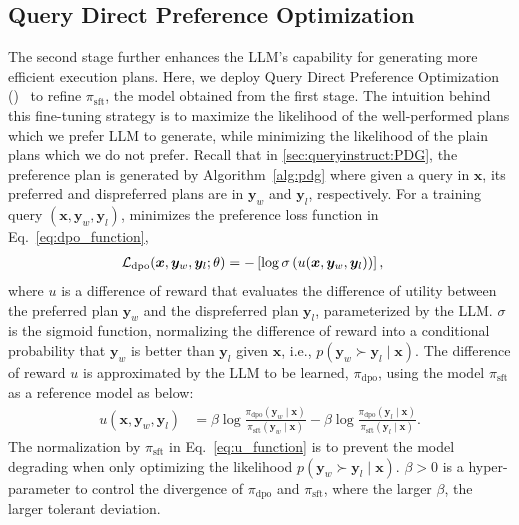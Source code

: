 \subsection{Query Direct Preference Optimization}
The second stage further enhances the LLM's capability for generating more efficient execution plans. 
Here, we deploy Query Direct Preference Optimization (\QDPO)~\cite{DBLP:conf/nips/RafailovSMMEF23} to refine  $\pi_{\mathrm{sft}}$, the model obtained from the first stage. 
The intuition behind this fine-tuning strategy is to maximize the likelihood of the well-performed plans which we prefer LLM to generate,  while minimizing the likelihood of the plain plans which we do not prefer.
Recall that in \cref{sec:queryinstruct:PDG},  the preference plan is generated by Algorithm~\ref{alg:pdg} where given a query in $\bm{x}$,  its preferred and dispreferred plans are in $\bm{y}_w$ and $\bm{y}_l$, respectively. 
For a training query $(\bm{x}, \bm{y}_w, \bm{y}_l)$, \QDPO minimizes the preference loss function in Eq.~\eqref{eq:dpo_function}, 
\begin{align}
    \mathcal{L}_{\mathrm{dpo}}(\bm{x}, \bm{y}_w, \bm{y}_l;\theta) &=-\left[\log\sigma\left(u(\bm{x}, \bm{y}_w, \bm{y}_l)\right)\right], \label{eq:dpo_function}
\end{align}
where $u$ is a difference of reward that evaluates the difference of utility between the preferred plan $\bm{y}_w$ and the dispreferred plan $\bm{y}_l$, parameterized by the LLM. $\sigma$ is the sigmoid function, 
normalizing the difference of reward into a conditional probability that $\bm{y}_{w}$ is better than $\bm{y}_l$ given $\bm{x}$, i.e., $p(\bm{y}_w \succ \bm{y}_l \mid \bm{x})$.
The difference of reward $u$ is approximated by the LLM to be learned, $\pi_{\mathrm{dpo}}$, using the \QIT model $\pi_{\mathrm{sft}}$ as a reference model as below:
\begin{align}
     u(\bm{x}, \bm{y}_w, \bm{y}_l) &=\beta\log\frac{\pi_{\mathrm{dpo}}(\bm{y}_w\mid \bm{x})}{\pi_{\mathrm{sft}}(\bm{y}_w\mid \bm{x})}-\beta\log\frac{\pi_{\mathrm{dpo}}(\bm{y}_l\mid \bm{x})}{\pi_{\mathrm{sft}}(\bm{y}_l\mid \bm{x})}. \label{eq:u_function} 
 \end{align}
The normalization by $\pi_{\mathrm{sft}}$ in Eq.~\eqref{eq:u_function} is to prevent the model degrading when only optimizing the likelihood $p(\bm{y}_w \succ \bm{y}_l \mid \bm{x})$. $\beta > 0$ is a hyper-parameter to control the divergence of $\pi_{\mathrm{dpo}}$ and $\pi_{\mathrm{sft}}$, where the larger $\beta$, the larger tolerant deviation.
